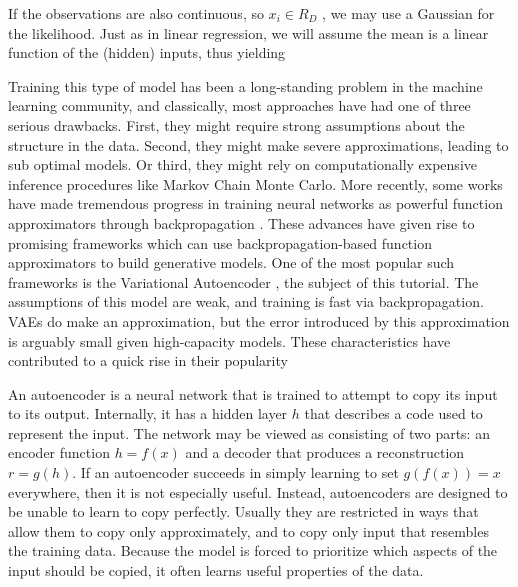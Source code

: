 
If the observations are also continuous, so $x_i \in R_D$ , we may use a Gaussian for the likelihood.
Just as in linear regression, we will assume the mean is a linear function of the (hidden) inputs,
thus yielding




Training this type of model has been a long-standing problem in the machine learning community, and classically, most approaches have had one of three serious drawbacks. First, they might require strong assumptions about the structure in the data. Second, they might make severe approximations, leading to sub optimal models. Or third, they might rely on computationally expensive inference procedures like Markov Chain Monte Carlo. More recently, some works have made tremendous progress in training neural networks as powerful function approximators through backpropagation \cite{NIPS2012_4824}. These advances have given rise to promising frameworks which can use backpropagation-based function approximators to build generative models. One of the most popular such frameworks is the Variational Autoencoder \cite{}, the subject of this tutorial. The assumptions of this model are weak, and training is fast via backpropagation. VAEs do make an approximation, but the error introduced by this approximation is arguably small given high-capacity models. These characteristics have contributed to a quick rise in their popularity

An autoencoder is a neural network that is trained to attempt to copy its input to its output. Internally, it has a hidden layer $h$ that describes a code used to represent the input. The network may be viewed as consisting of two parts: an encoder function $h=f(x)$ and a decoder that produces a reconstruction $r=g(h)$. If an autoencoder succeeds in simply learning to set $g(f(x))=x$ everywhere, then it is not especially useful. Instead, autoencoders are designed to be unable to learn to copy perfectly. Usually they are restricted in ways that allow them to copy only approximately, and to copy only input that resembles the training data. Because the model is forced to prioritize which aspects of the input should be copied, it often learns useful properties of the data.
%

